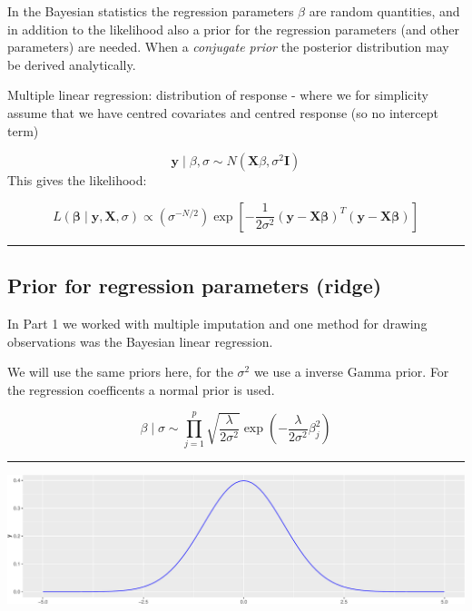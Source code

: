 \documentclass[
  letterpaper,
  DIV=11,
  numbers=noendperiod]{scrartcl}
\begin{document}
In the Bayesian statistics the regression parameters \(\beta\) are
random quantities, and in addition to the likelihood also a prior for
the regression parameters (and other parameters) are needed. When a
\emph{conjugate prior} the posterior distribution may be derived
analytically.

Multiple linear regression: distribution of response - where we for
simplicity assume that we have centred covariates and centred response
(so no intercept term)

\[ {\boldsymbol y}\mid \beta, \sigma \sim N({\boldsymbol X}\beta,\sigma^2 {\boldsymbol I})\]
This gives the likelihood:

\[ L(\boldsymbol \beta \mid \boldsymbol y,\boldsymbol X, \sigma) \propto 
(\sigma^{-N/2}) \exp[- \frac{1}{2 \sigma^2}(\boldsymbol y -\boldsymbol X \boldsymbol \beta)^T(\boldsymbol y -\boldsymbol X \boldsymbol \beta)]\]

\begin{center}\rule{0.5\linewidth}{0.5pt}\end{center}

\hypertarget{prior-for-regression-parameters-ridge}{%
\subsection{Prior for regression parameters
(ridge)}\label{prior-for-regression-parameters-ridge}}

In Part 1 we worked with multiple imputation and one method for drawing
observations was the Bayesian linear regression.

We will use the same priors here, for the \(\sigma^2\) we use a inverse
Gamma prior. For the regression coefficents a normal prior is used.

\[\beta \mid \sigma \sim \prod_{j=1}^p \sqrt{\frac{\lambda}{2 \sigma^2}}\exp(-\frac{\lambda}{2 \sigma^2}\beta_j^2)\]

\begin{center}\rule{0.5\linewidth}{0.5pt}\end{center}

\includegraphics{W6_files/figure-pdf/unnamed-chunk-6-1.pdf}
\end{document}
